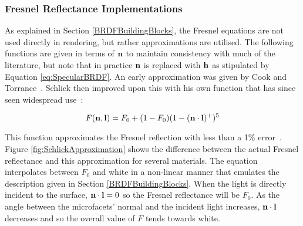 \subsubsection{Fresnel Reflectance Implementations}

As explained in Section \ref{BRDFBuildingBlocks}, the Fresnel equations are not used directly in rendering, but rather approximations are utilised. The following functions are given in terms of \begin{math}\mathbf{n}\end{math} to maintain consistency with much of the literature, but note that in practice \begin{math}\mathbf{n}\end{math} is replaced with \begin{math}\mathbf{h}\end{math} as stipulated by Equation \ref{eq:SpecularBRDF}. An early approximation was given by Cook and Torrance~\cite{CookTorrance}. Schlick then improved upon this with his own function that has since seen widespread use~\cite{SchlickApproximation}:

\begin{equation} \label{eq:SchlickAppoximation}
	F(\mathbf{n}, \mathbf{l}) = F_0 + (1 - F_0)(1 - (\mathbf{n}\cdot\mathbf{l})^+)^5
\end{equation}

This function approximates the Fresnel reflection with less than a 1\% error~\cite{SchlickApproximation}. Figure \ref{fig:SchlickApproximation} shows the difference between the actual Fresnel reflectance and this approximation for several materials. The equation interpolates between \begin{math}F_0\end{math} and white in a non-linear manner that emulates the description given in Section \ref{BRDFBuildingBlocks}. When the light is directly incident to the surface, \begin{math}\mathbf{n}\cdot\mathbf{l} = 0\end{math} so the Fresnel reflectance will be \begin{math}F_0\end{math}. As the angle between the microfacets' normal and the incident light increases, \begin{math}\mathbf{n}\cdot\mathbf{l}\end{math} decreases and so the overall value of \begin{math}F\end{math} tends towards white.

